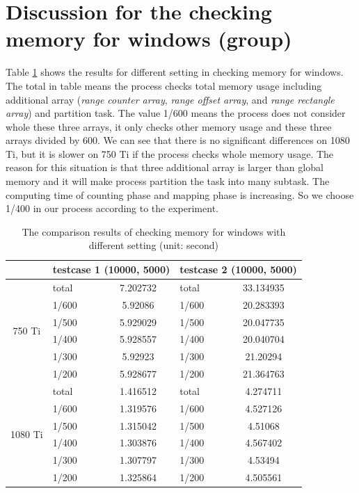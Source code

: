\section{Discussion for the checking memory for windows (group)}
Table \ref{table:5_15} shows the results for different setting in checking memory for windows. The total in table means the process checks total memory usage including additional array (\textit{range counter array}, \textit{range offset array}, and \textit{range rectangle array}) and partition task. The value 1/600 means the process does not consider whole these three arrays, it only checks other memory usage and these three arrays divided by 600. We can see that there is no significant differences on 1080 Ti, but it is slower on 750 Ti if the process checks whole memory usage. The reason for this situation is that three additional array is larger than global memory and it will make process partition the task into many subtask. The computing time of counting phase and mapping phase is increasing. So we choose 1/400 in our process according to the experiment.

\begin{table}[!h]
\centering
\begin{tabular}{|c|l|c|l|c|}
\hline
\multicolumn{1}{|l|}{}   & \multicolumn{2}{l|}{testcase 1 (10000, 5000)} & \multicolumn{2}{l|}{testcase 2 (10000, 5000)} \\ \hline
\multirow{6}{*}{750 Ti}  & total & 7.202732 & total & 33.134935 \\ \cline{2-5} 
                         & 1/600 & 5.92086 & 1/600 & 20.283393 \\ \cline{2-5} 
                         & 1/500 & 5.929029 & 1/500 & 20.047735 \\ \cline{2-5} 
                         & 1/400 & 5.928557 & 1/400 & 20.040704 \\ \cline{2-5} 
                         & 1/300 & 5.92923 & 1/300 & 21.20294 \\ \cline{2-5} 
                         & 1/200 & 5.928677 & 1/200 & 21.364763 \\ \hline
\multirow{6}{*}{1080 Ti} & total & 1.416512 & total & 4.274711 \\ \cline{2-5} 
                         & 1/600 & 1.319576 & 1/600 & 4.527126 \\ \cline{2-5} 
                         & 1/500 & 1.315042 & 1/500 & 4.51068 \\ \cline{2-5} 
                         & 1/400 & 1.303876 & 1/400 & 4.567402 \\ \cline{2-5} 
                         & 1/300 & 1.307797 & 1/300 & 4.53494 \\ \cline{2-5} 
                         & 1/200 & 1.325864 & 1/200 & 4.505561 \\ \hline
\end{tabular}
\caption{The comparison results of checking memory for windows with different setting (unit: second)}
\label{table:5_15}
\end{table}

